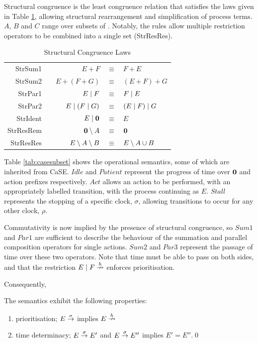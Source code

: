 Structural congruence is the least congruence relation that satisfies
the laws given in Table \ref{tab:structcong}, allowing structural
rearrangement and simplification of process terms. $A$, $B$ and $C$
range over subsets of \symbols.  Notably, the rules allow multiple
restriction operators to be combined into a single set (StrResRes).

\begin{table}
 \caption{Structural Congruence Laws}
 \label{tab:structcong}
  \shrule \centering
  \begin{tabular}{rcrcl}
  StrSum1 & \quad\quad &  
  $E + F$              & $\equiv$ & $F + E$
\\
  StrSum2 &&  
  $E + (F + G)$        & $\equiv$ & $(E + F) + G$
\\
  StrPar1 &&  
  $E \;|\; F$            & $\equiv$ & $F \;|\; E$
\\
  StrPar2 &&  
  $E \;|\; (F \;|\; G)$    & $\equiv$ & $(E \;|\; F) \;|\; G$
\\
  StrIdent &&  
  $E \;|\; \textbf{0}$         & $\equiv$ & $E$
\\
  StrResRem &&  
  $\textbf{0} \setminus {A}$       & $\equiv$ & $\textbf{0}$
\\
  StrResRes &&  
  $E \setminus {A} \setminus {B}$  & $\equiv$ & $E \setminus {A \cup B}$
  \end{tabular}
  \shrule
\end{table}

Table \ref{tab:casesubset} shows the operational semantics, some of
which are inherited from CaSE.  $Idle$ and $Patient$ represent
the progress of time over $\textbf{0}$ and action prefixes respectively.
$Act$ allows an action to be performed, with an appropriately labelled
transition, with the process continuing as $E$.  $Stall$ represents
the stopping of a specific clock, $\sigma$, allowing transitions to
occur for any other clock, $\rho$.

Commutativity is now implied by the presence of structural congruence,
so $Sum1$ and $Par1$ are sufficient to describe the behaviour of the
summation and parallel composition operators for single actions.  $Sum2$
and $Par3$ represent the passage of time over these two operators.  Note
that time must be able to pass on both sides, and that the restriction
$E \mid F \stackrel{h}{\nrightarrow}$ enforces prioritisation.

Consequently,

\begin{proposition}
The semantics exhibit the following properties:
\begin{enumerate}
\item prioritisation;
$E \stackrel{\sigma}{\rightarrow}$ implies $E \stackrel{h}{\nrightarrow}$ 
\item time determinacy; $E \stackrel{\sigma}{\rightarrow} E'$ and $E
\stackrel{\sigma}{\rightarrow} E''$ implies $E' = E''$.\qed
\end{enumerate}
\end{proposition}

